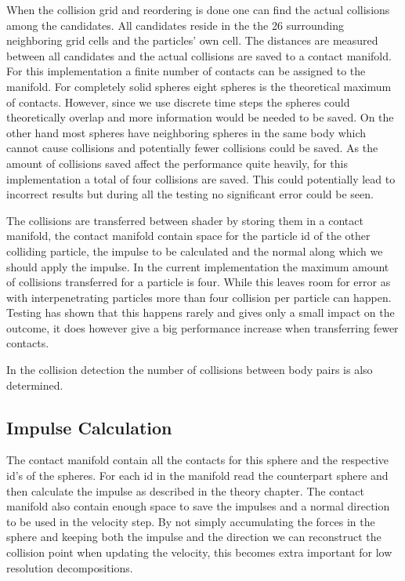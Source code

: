 When the collision grid and reordering is done one can find the actual collisions
among the candidates. All candidates reside in the the 26 surrounding neighboring
grid cells and the particles' own cell. The distances are measured between all
candidates and the actual collisions are saved to a contact manifold.
For this implementation a finite number of
contacts can be assigned to the manifold. For completely solid spheres eight spheres
is the theoretical maximum of contacts. However, since we use discrete time steps
the spheres could theoretically overlap and more information would be needed to be saved.
On the other hand most spheres have neighboring spheres in the same body which cannot
cause collisions and potentially fewer collisions could be saved. As the amount of
collisions saved affect the performance quite heavily, for this implementation a total
of four collisions are saved. This could potentially lead to incorrect results but
during all the testing no significant error could be seen.

The collisions are transferred between shader by storing them in a contact manifold,
the contact manifold contain space for the particle id of the other colliding particle,
the impulse to be calculated and the normal along which we should apply the impulse.
In the current implementation the maximum amount of collisions transferred for a
particle is four. While this leaves room for error as with interpenetrating particles
more than four collision per particle can happen. Testing has shown that this happens
rarely and gives only a small impact on the outcome, it does however give a big
performance increase when transferring fewer contacts.

In the collision detection the number of collisions between body pairs is also determined.


\subsection{Impulse Calculation}
The contact manifold contain all the contacts for this sphere and the respective
id's of the spheres. For each id in the manifold read the counterpart sphere and
then calculate the impulse as described in the theory chapter. The contact manifold
also contain enough space to save the impulses and a normal direction to be used
in the velocity step. By not simply accumulating the forces in the sphere and keeping
both the impulse and the direction we can reconstruct the collision point when updating
the velocity, this becomes extra important for low resolution decompositions.


